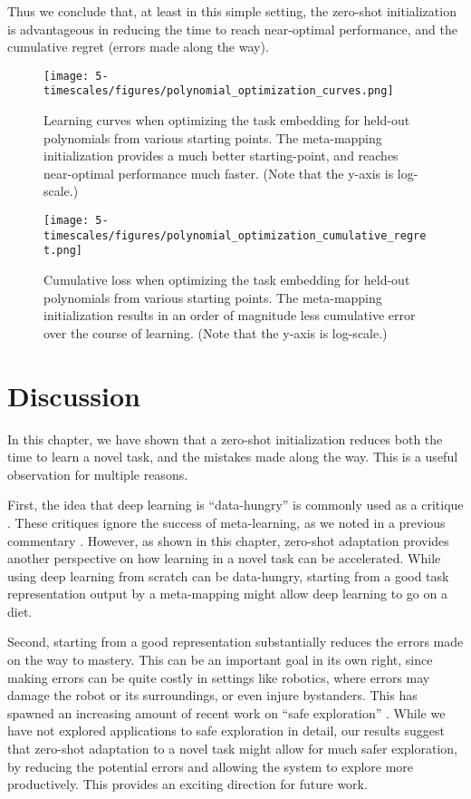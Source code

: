 Thus we conclude that, at least in this simple setting, the zero-shot initialization is advantageous in reducing the time to reach near-optimal performance, and the cumulative regret (errors made along the way). \par 
\begin{figure}
\centering
\texttt{[image: 5-timescales/figures/polynomial\_optimization\_curves.png]}
\caption{Learning curves when optimizing the task embedding for held-out polynomials from various starting points. The meta-mapping initialization provides a much better starting-point, and reaches near-optimal performance much faster. (Note that the y-axis is log-scale.)} \label{fig:timescales_polynomial_optimization_curves}
\end{figure}

\begin{figure}
\centering
\texttt{[image: 5-timescales/figures/polynomial\_optimization\_cumulative\_regret.png]}
\caption{Cumulative loss when optimizing the task embedding for held-out polynomials from various starting points. The meta-mapping initialization results in an order of magnitude less cumulative error over the course of learning. (Note that the y-axis is log-scale.)} \label{fig:timescales_polynomial_optimization_regret}
\end{figure}

\section{Discussion}
In this chapter, we have shown that a zero-shot initialization reduces both the time to learn a novel task, and the mistakes made along the way. This is a useful observation for multiple reasons. \par 
First, the idea that deep learning is ``data-hungry'' is commonly used as a critique \citep[e.g.]{Lake2016, Marcus2018}. These critiques ignore the success of meta-learning, as we noted in a previous commentary \citep{Hansen2017}. However, as shown in this chapter, zero-shot adaptation provides another perspective on how learning in a novel task can be accelerated. While using deep learning from scratch can be data-hungry, starting from a good task representation output by a meta-mapping might allow deep learning to go on a diet. \par  
Second, starting from a good representation substantially reduces the errors made on the way to mastery. This can be an important goal in its own right, since making errors can be quite costly in settings like robotics, where errors may damage the robot or its surroundings, or even injure bystanders. This has spawned an increasing amount of recent work on ``safe exploration'' \citep[e.g.][]{Turchetta2016, Turchetta2019}. While we have not explored applications to safe exploration in detail, our results suggest that zero-shot adaptation to a novel task might allow for much safer exploration, by reducing the potential errors and allowing the system to explore more productively. This provides an exciting direction for future work. \par  

